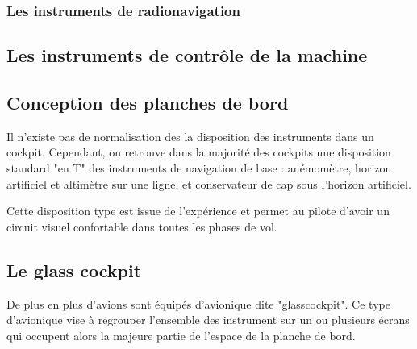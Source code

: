 	\begin{figure}[H]	
	\centering
	\end{figure}
	
	\subsubsection{Les instruments de radionavigation}
	
	\subsection{Les instruments de contrôle de la machine}
	
	\subsection{Conception des planches de bord}
	Il n'existe pas de normalisation des la disposition des instruments dans un cockpit. Cependant, on retrouve dans la majorité des cockpits une disposition standard "en T" des instruments de navigation de base : anémomètre, horizon artificiel et altimètre sur une ligne, et conservateur de cap sous l'horizon artificiel.
	
	\begin{figure}[H]	
	\centering
	\end{figure}
	
	Cette disposition type est issue de l'expérience et permet au pilote d'avoir un circuit visuel confortable dans toutes les phases de vol.
	
	\subsection{Le glass cockpit}
	
	De plus en plus d'avions sont équipés d'avionique dite "\gls{glasscockpit}". Ce type d'avionique vise à regrouper l'ensemble des instrument sur un ou plusieurs écrans qui occupent alors la majeure partie de l'espace de la planche de bord.
	
